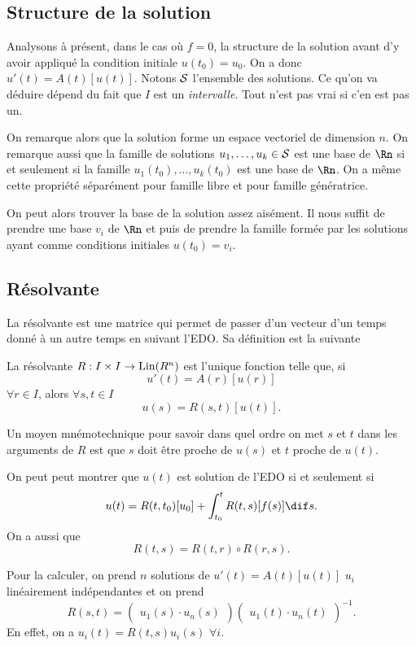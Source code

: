 \subsection{Structure de la solution}
\label{sec:struct}
Analysons à présent, dans le cas où $f = 0$,
la structure de la solution avant d'y avoir appliqué la condition initiale
$u(t_0) = u_0$.
On a donc $u'(t) = A(t)[u(t)]$.
Notons $\mathcal{S}$ l'ensemble des solutions.
Ce qu'on va déduire dépend du fait que $I$ est un \emph{intervalle}.
Tout n'est pas vrai si c'en est pas un.

On remarque alors que la solution forme un espace vectoriel
de dimension $n$.
On remarque aussi que la famille de solutions $u_1, \ldots, u_k \in \mathcal{S}$
est une base de $\Rn$ si et seulement si
la famille $u_1(t_0), \ldots, u_k(t_0)$ est une base de $\Rn$.
On a même cette propriété séparément pour famille libre et pour
famille génératrice.

On peut alors trouver la base de la solution assez aisément.
Il nous suffit de prendre une base $v_i$ de $\Rn$
et puis de prendre la famille
formée par les solutions ayant comme conditions initiales $u(t_0) = v_i$.

\subsection{Résolvante}
La résolvante est une matrice qui permet de passer d'un vecteur d'un
temps donné à un autre temps en suivant l'EDO.
Sa définition est la suivante

\begin{mydef}[Résolvante]
  La résolvante $R: I \times I \to \operatorname{Lin}(R^n)$ est l'unique fonction
  telle que, si
  \[ u'(t) = A(r)[u(r)] \]
  $\forall r \in I$, alors $\forall s, t \in I$
  \[ u(s) = R(s, t)[u(t)]. \]
\end{mydef}
Un moyen mnémotechnique pour savoir dans quel ordre on met $s$ et $t$ dans
les arguments de $R$ est que $s$ doit être proche de $u(s)$ et $t$ proche
de $u(t)$.

On peut peut montrer que $u(t)$ est solution de l'EDO si et seulement si
\[ u(t) = R(t, t_0)[u_0] + \int_{t_0}^t R(t,s)[f(s)] \dif s. \]
On a aussi que
\[ R(t, s) = R(t, r) \circ R(r, s). \]

Pour la calculer, on prend $n$ solutions de $u'(t) = A(t)[u(t)]$
$u_i$ linéairement indépendantes et on prend
\[ R(s, t) =
  \begin{pmatrix}
    u_1(s) \cdot u_n(s)
  \end{pmatrix}
  \begin{pmatrix}
    u_1(t) \cdot u_n(t)
\end{pmatrix}^{-1}. \]
En effet, on a $u_i(t) = R(t, s) u_i(s)$ $\forall i$.

